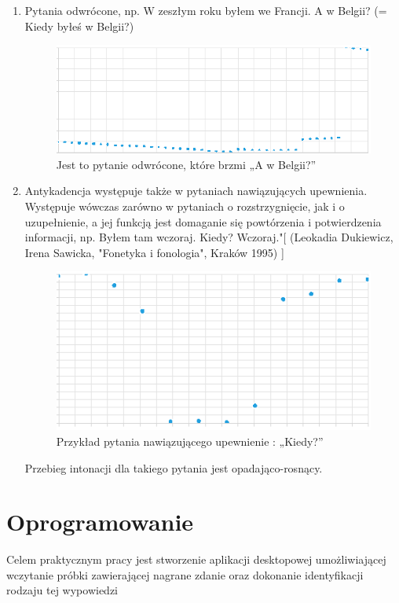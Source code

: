 \documentclass[a4paper,12 pt]{article}
\begin{document}
\begin{enumerate}
\begin{enumerate}
\item Pytania odwrócone, np. W zeszłym roku byłem we Francji. A w Belgii? (= Kiedy byłeś w Belgii?) 
\begin{figure}[h]
\centering
\includegraphics[scale=0.9]{pytanie_odwrocone.png}
\caption{Jest to pytanie odwrócone, które brzmi „A w Belgii?”}
\end{figure}
\FloatBarrier
\item Antykadencja występuje  także w pytaniach nawiązujących upewnienia. Występuje wówczas zarówno w  pytaniach o rozstrzygnięcie, jak i o uzupełnienie, a jej funkcją jest domaganie  się powtórzenia i potwierdzenia informacji, np. Byłem tam wczoraj. Kiedy?  Wczoraj."[  (Leokadia Dukiewicz, Irena Sawicka, "Fonetyka i fonologia", Kraków 1995) ]
\begin{figure}[h]

\centering
\includegraphics[scale=0.9]{kiedy.png}
\caption{Przykład pytania nawiązującego upewnienie : „Kiedy?”}
\end{figure}
\FloatBarrier
Przebieg intonacji dla takiego pytania jest opadająco-rosnący.
\end{enumerate}
\end{enumerate}
\section{Oprogramowanie}
Celem praktycznym pracy jest stworzenie aplikacji desktopowej umożliwiającej wczytanie próbki zawierającej nagrane zdanie oraz dokonanie identyfikacji rodzaju tej wypowiedzi
\end{document}
